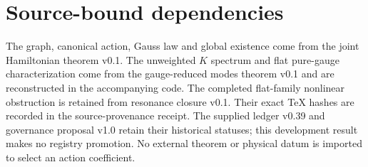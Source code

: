 \documentclass[11pt,a4paper]{article}
\begin{document}
\section{Source-bound dependencies}
The graph, canonical action, Gauss law and global existence come from the joint Hamiltonian theorem v0.1. The unweighted $K$ spectrum and flat pure-gauge characterization come from the gauge-reduced modes theorem v0.1 and are reconstructed in the accompanying code. The completed flat-family nonlinear obstruction is retained from resonance closure v0.1. Their exact TeX hashes are recorded in the source-provenance receipt. The supplied ledger v0.39 and governance proposal v1.0 retain their historical statuses; this development result makes no registry promotion. No external theorem or physical datum is imported to select an action coefficient.
\end{document}
